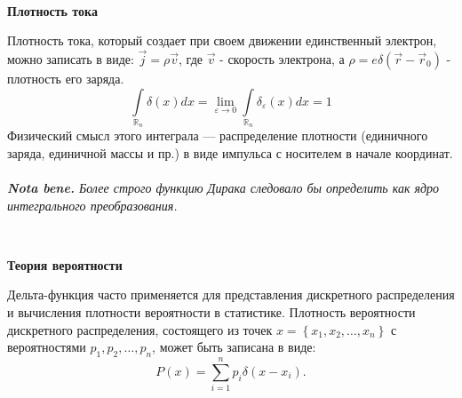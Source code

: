 \documentclass[russian,12pt]{article}
\providecommand{\subheader}[1]{
    \,
    \begin{center}
        {\large \textbf{#1}}
    \end{center}
    }
\begin{document}
\subheader{Плотность тока}
Плотность тока, который создает при своем движении единственный электрон, можно записать в виде: $\vec{j}=\rho\vec{v}$, где $\vec{v}$ - скорость электрона, а $\rho= e\delta(\vec{r} - \vec{r}_0)$ - плотность его заряда.
$$\int\limits_{\mathbb{R}_n}\delta(x)dx = \lim_{\varepsilon \rightarrow 0} \int\limits_{\mathbb{R}_n}\delta_\varepsilon(x)dx = 1$$
Физический смысл этого интеграла --- распределение плотности (единичного заряда, единичной массы и пр.) в виде импульса с носителем в начале координат.\\ \, \\
\textit{\textbf{Nota bene.} Более строго функцию Дирака следовало бы определить как ядро интегрального преобразования.}

\subheader{Теория вероятности}
Дельта-функция часто применяется для представления дискретного распределения и вычисления плотности вероятности в статистике.
Плотность вероятности дискретного распределения, состоящего из точек $x = \left\{x_1, x_2, \dots, x_n\right\}$ с вероятностями $p_1, p_2, \dots, p_n$, может быть записана в виде:
$$P(x) = \sum\limits_{i=1}^n p_i\delta(x-x_i).$$
\end{document}
